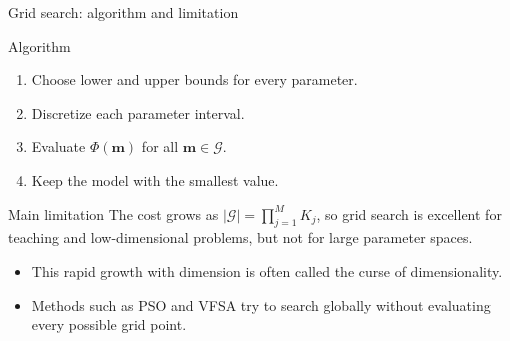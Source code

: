 \documentclass[aspectratio=169]{beamer}
\renewcommand{\vec}[1]{\mathbf{#1}}
\newcommand{\mm}{ {\vec{m}} }
\begin{document}
\begin{frame}{Grid search: algorithm and limitation}
\small

\begin{block}{Algorithm}
\begin{enumerate}
    \item[--] Choose lower and upper bounds for every parameter.
    \item[--] Discretize each parameter interval.
    \item[--] Evaluate $\Phi(\mm)$ for all $\mm\in\mathcal{G}$.
    \item[--] Keep the model with the smallest value.
\end{enumerate}
\end{block}

\begin{alertblock}{Main limitation}
The cost grows as $|\mathcal{G}|=\prod_{j=1}^M K_j$, so grid search is excellent for teaching and low-dimensional problems, but not for large parameter spaces.
\end{alertblock}

\begin{itemize}
    \item[--] This rapid growth with dimension is often called the \alert{curse of dimensionality}.
    \item[--] Methods such as PSO and VFSA try to search globally without evaluating every possible grid point.
\end{itemize}
\end{frame}
\end{document}
